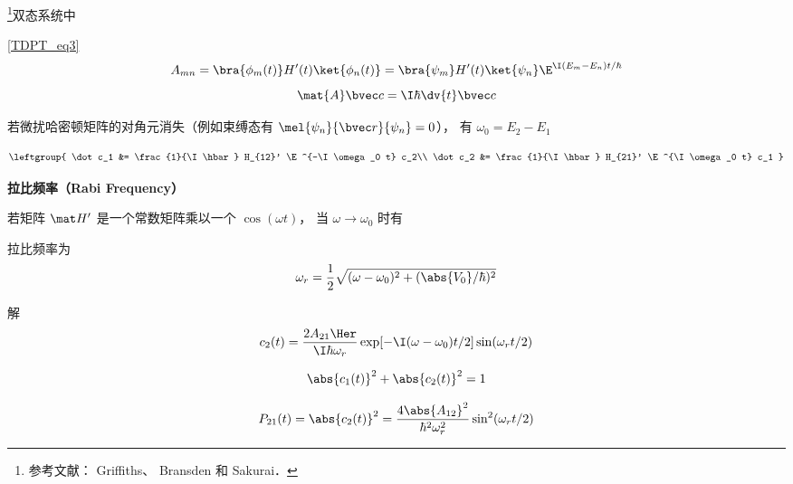 
\begin{issues}
\issueDraft
\end{issues}

\footnote{参考文献： Griffiths\cite{GriffQ}、 Bransden\cite{Brandsen} 和 Sakurai\cite{Sakurai}．}双态系统中

\autoref{TDPT_eq3}~
\begin{equation}
A_{mn} = \bra{\phi_m(t)} H'(t) \ket{\phi_n(t)} = \bra{\psi_m} H'(t) \ket{\psi_n} \E^{\I(E_m-E_n)t/\hbar}
\end{equation}
\begin{equation}
\mat {A} \bvec c = \I\hbar \dv{t} \bvec c
\end{equation}

若微扰哈密顿矩阵的对角元消失（例如束缚态有 $\mel{\psi_n}{\bvec r}{\psi_n} = 0$）， 有 $\omega_0 = E_2 - E_1$


\begin{equation}
\leftgroup{
\dot c_1 &= \frac{1}{\I \hbar} H_{12}' \E^{-\I\omega_0 t} c_2\\
\dot c_2 &= \frac{1}{\I \hbar} H_{21}' \E^{\I\omega_0 t} c_1
}\end{equation}

\textbf{拉比频率（Rabi Frequency）}

若矩阵 $\mat H'$ 是一个常数矩阵乘以一个 $\cos(\omega t)$， 当 $\omega \to \omega_0$ 时有


拉比频率为
\begin{equation}
\omega_r = \frac{1}{2} \sqrt{(\omega - \omega_0)^2 + (\abs{V_0}/\hbar)^2}
\end{equation}

解
\begin{equation}
c_2(t) = \frac{2A_{21}\Her}{\I \hbar \omega_r} \exp[-\I (\omega - \omega_0) t / 2] \sin(\omega_r t/2)
\end{equation}


\begin{equation}
\abs{c_1(t)}^2 + \abs{c_2(t)}^2 = 1
\end{equation}

\begin{equation}
P_{21}(t) = \abs{c_2(t)}^2 = \frac{4\abs{A_{12}}^2}{\hbar^2 \omega_r^2} \sin^2(\omega_r t/2)
\end{equation}
